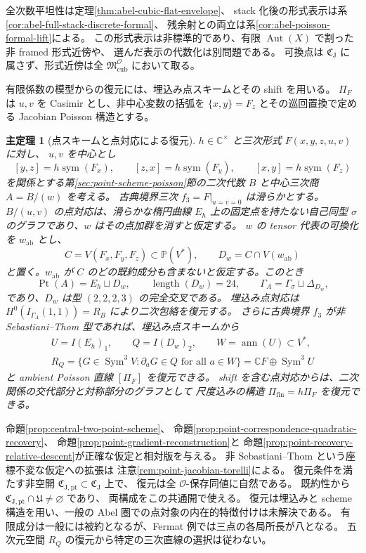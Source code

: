 \documentclass[11pt,a4paper]{ltjsarticle}
\numberwithin{equation}{section}
\newtheorem{maintheorem}{主定理}
\newcommand{\C}{\mathbb C}
\newcommand{\PP}{\mathbb P}
\newcommand{\Sym}{\operatorname{Sym}}
\newcommand{\Aut}{\operatorname{Aut}}
\newcommand{\Symm}{\operatorname{sym}}
\begin{document}
全次数平坦性は定理\ref{thm:abel-cubic-flat-envelope}、
stack 化後の形式表示は系\ref{cor:abel-full-stack-discrete-formal}、
残余射との両立は系\ref{cor:abel-poisson-formal-lift}による。
この形式表示は非標準的であり、有限 $\Aut(X)$ で割った非 framed 形式近傍や、
選んだ表示の代数化は別問題である。
可換点は $\mathfrak C_{\mathrm J}$ に属さず、形式近傍は全
$\mathfrak M^{\mathcal O}_{\mathrm{cub}}$ において取る。

有限係数の模型からの復元には、埋込み点スキームとその shift を用いる。
$\Pi_F$ は $u,v$ を Casimir とし、非中心変数の括弧を
$\{x,y\}=F_z$ とその巡回置換で定める Jacobian Poisson 構造とする。

\begin{maintheorem}[点スキームと点対応による復元]\label{thm:intro-points}
$h\in\C^\times$ と三次形式 $F(x,y,z,u,v)$ に対し、
$u,v$ を中心とし
\[
 [y,z]=h\Symm(F_x),\qquad [z,x]=h\Symm(F_y),\qquad [x,y]=h\Symm(F_z)
\]
を関係とする第\ref{sec:point-scheme-poisson}節の二次代数 $B$ と中心三次商 $A=B/(w)$ を考える。
古典境界三次 $f_3=F|_{u=v=0}$ は滑らかとする。
$B/(u,v)$ の点対応は、滑らかな楕円曲線 $E_h$ 上の固定点を持たない自己同型
$\sigma$ のグラフであり、$w$ はその点加群を消すと仮定する。
$w$ の tensor 代表の可換化を $w_{\mathrm{ab}}$ とし、
\[
 C=V(F_x,F_y,F_z)\subset\PP(V^*),\qquad
 D_w=C\cap V(w_{\mathrm{ab}})
\]
と置く。$w_{\mathrm{ab}}$ が $C$ のどの既約成分も含まないと仮定する。このとき
\[
 \operatorname{Pt}(A)=E_h\sqcup D_w,\qquad \operatorname{length}(D_w)=24,
 \qquad \Gamma_A=\Gamma_\sigma\sqcup\Delta_{D_w},
\]
であり、$D_w$ は型 $(2,2,2,3)$ の完全交叉である。
埋込み点対応は $H^0(I_{\Gamma_A}(1,1))=R_B$ により二次包絡を復元する。
さらに古典境界 $f_3$ が非 Sebastiani--Thom 型であれば、埋込み点スキームから
\[
 \begin{gathered}
 U=I(E_h)_1,\qquad Q=I(D_w)_2,\qquad W=\operatorname{ann}(U)\subset V^*,\\
 R_Q=\{G\in\Sym^3V:\partial_aG\in Q\text{ for all }a\in W\}
        =\C F\oplus\Sym^3U
 \end{gathered}
\]
と ambient Poisson 直線 $[\Pi_F]$ を復元できる。
shift を含む点対応からは、二次関係の交代部分と対称部分のグラフとして
尺度込みの構造 $\Pi_{\mathrm{fin}}=h\Pi_F$ を復元できる。
\end{maintheorem}

命題\ref{prop:central-two-point-scheme}、
命題\ref{prop:point-correspondence-quadratic-recovery}、
命題\ref{prop:point-gradient-reconstruction}と
命題\ref{prop:point-recovery-relative-descent}が正確な仮定と相対版を与える。
非 Sebastiani--Thom という座標不変な仮定への拡張は
注意\ref{rem:point-jacobian-torelli}による。
復元条件を満たす非空開 $\mathfrak C_{\mathrm{J,pt}}\subset\mathfrak C_{\mathrm J}$ 上で、
復元は全 $\mathcal O$-保存同値に自然である。
既約性から $\mathfrak C_{\mathrm{J,pt}}\cap\mathfrak U\ne\varnothing$ であり、
両構成をこの共通開で使える。
復元は埋込みと scheme 構造を用い、一般の Abel 圏での点対象の内在的特徴付けは未解決である。
有限成分は一般には被約となるが、Fermat 例では三点の各局所長が八となる。
五次元空間 $R_Q$ の復元から特定の三次直線の選択は従わない。
\end{document}
